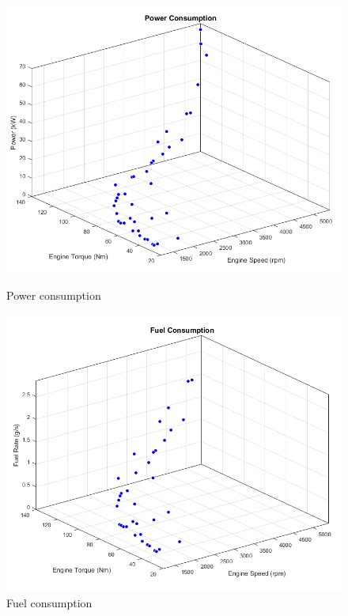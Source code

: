 \begin{figure}[h]
\centering
\begin{minipage}{.5\textwidth}
 	\centering
	\includegraphics[scale=0.35]{figures/power}
\caption{Power consumption}
\label{fig:powerFit}
\end{minipage}%
\begin{minipage}{.5\textwidth}
  \centering
\includegraphics[scale=0.35]{figures/fuel}
  \caption{Fuel consumption}
  \label{fig:fuelFit}
\end{minipage}
\end{figure}

